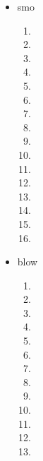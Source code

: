 \documentclass[titlepage]{article}
\begin{document}
\begin{itemize}
\begin{enumerate}
                        \end{enumerate}
                    \item smo
                        \begin{enumerate}
                            \item
                            \item
                            \item
                            \item
                            \item
                            \item
                            \item
                            \item
                            \item
                            \item
                            \item
                            \item
                            \item
                            \item
                            \item
                            \item
                        \end{enumerate}
                    \item blow
                        \begin{enumerate}
                            \item
                            \item
                            \item
                            \item
                            \item
                            \item
                            \item
                            \item
                            \item
                            \item
                            \item
                            \item
                            \item

\end{enumerate}
\end{itemize}
\end{document}
